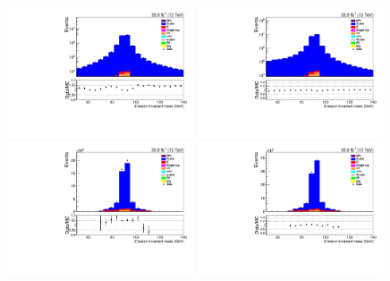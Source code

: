 \begin{figure}[ht]
\centering
\includegraphics[width=0.49\textwidth]{figs/background-estimation/plots/unblinded/prompt_ee_ttbarInc/zPairMass_NPL_ee_lepSel_ee_log.pdf}
\includegraphics[width=0.49\textwidth]{figs/background-estimation/plots/unblinded/prompt_mumu_ttbarInc/zPairMass_NPL_mumu_lepSel_mumu_log.pdf}
\\
\includegraphics[width=0.49\textwidth]{figs/background-estimation/plots/unblinded/prompt_ee_ttbarInc/zPairMass_NPL_ee_jetSel_ee.pdf}
\includegraphics[width=0.49\textwidth]{figs/background-estimation/plots/unblinded/prompt_mumu_ttbarInc/zPairMass_NPL_mumu_jetSel_mumu.pdf}
\\

\end{figure}
